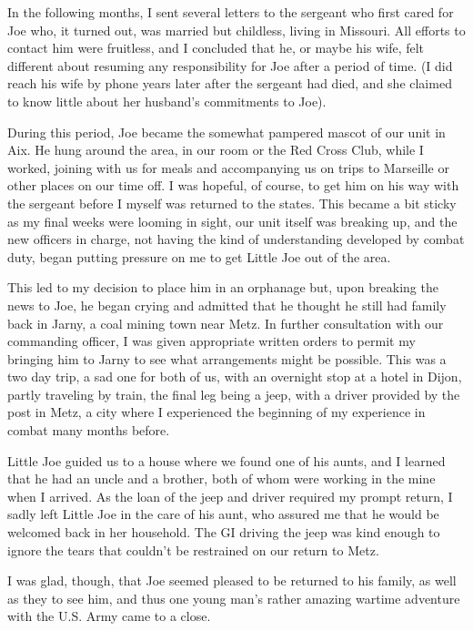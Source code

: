 \documentclass[../m3y]{subfiles}
\begin{document}
In the following months, I sent several letters to the sergeant who first cared for Joe who, it turned out, was married but childless, living in Missouri. All efforts to contact him were fruitless, and I concluded that he, or maybe his wife, felt different about resuming any responsibility for Joe after a period of time. (I did reach his wife by phone years later after the sergeant had died, and she claimed to know little about her husband's commitments to Joe).

During this period, Joe became the somewhat pampered mascot of our unit in Aix. He hung around the area, in our room or the Red Cross Club, while I worked, joining with us for meals and accompanying us on trips to Marseille or other places on our time off. I was hopeful, of course, to get him on his way with the sergeant before I myself was returned to the states. This became a bit sticky as my final weeks were looming in sight, our unit itself was breaking up, and the new officers in charge, not having the kind of understanding developed by combat duty, began putting pressure on me to get Little Joe out of the area.

This led to my decision to place him in an orphanage but, upon breaking the news to Joe, he began crying and admitted that he thought he still had family back in Jarny, a coal mining town near Metz. In further consultation with our commanding officer, I was given appropriate written orders to permit my bringing him to Jarny to see what arrangements might be possible. This was a two day trip, a sad one for both of us, with an overnight stop at a hotel in Dijon, partly traveling by train, the final leg being a jeep, with a driver provided by the post in Metz, a city where I experienced the beginning of my experience in combat many months before.

Little Joe guided us to a house where we found one of his aunts, and I learned that he had an uncle and a brother, both of whom were working in the mine when I arrived. As the loan of the jeep and driver required my prompt return, I sadly left Little Joe in the care of his aunt, who assured me that he would be welcomed back in her household. The GI driving the jeep was kind enough to ignore the tears that couldn't be restrained on our return to Metz.

I was glad, though, that Joe seemed pleased to be returned to his family, as well as they to see him, and thus one young man's rather amazing wartime adventure with the U.S. Army came to a close.
\end{document}
